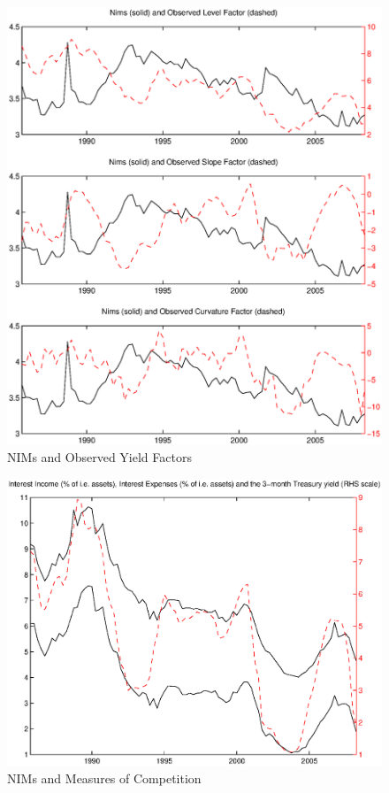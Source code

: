 \documentclass[11pt]{article}
\begin{document}
\newpage \clearpage
\begin{figure}
\caption{NIMs and Observed Yield Factors} \label{figure_nims_factors}
\center
\includegraphics[scale=0.85]{figure_nims_factors.ps}
\end{figure}

\newpage \clearpage
\begin{figure}
\caption{NIMs and Measures of Competition} \label{figure_nims_competition}
\center
\includegraphics[scale=0.85]{figure_nims_competition.ps}
\end{figure}
\end{document}
